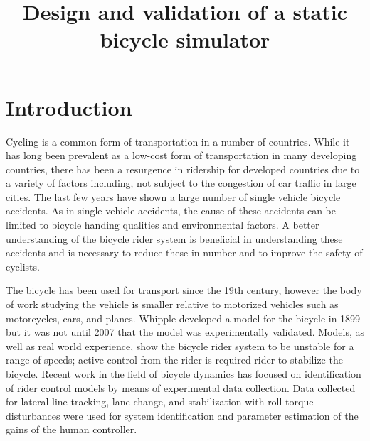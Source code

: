 \documentclass[11pt,a4paper,reqno]{amsart}
\title{Design and validation of a static bicycle simulator}
\begin{document}
\maketitle

\section{Introduction}
Cycling is a common form of transportation in a number of countries.
While it has long been prevalent as a low-cost form of transportation in many developing countries,
there has been a resurgence in ridership for developed countries\cite{FIXME} due to a variety of factors including,
not subject to the congestion of car traffic in large cities.
The last few years have shown a large number of single vehicle bicycle accidents\cite{FIXME}.
As in single-vehicle accidents, the cause of these accidents can be limited to bicycle handing qualities and
environmental factors.
A better understanding of the bicycle rider system is beneficial in understanding these accidents and is necessary to
reduce these in number and to improve the safety of cyclists.

The bicycle has been used for transport since the 19th century\cite{wilson2004}, however the body of work studying the
vehicle is smaller relative to motorized vehicles such as motorcycles, cars, and planes.
Whipple developed a model for the bicycle in 1899\cite{whipple1899} but it was not until 2007 that the model was
experimentally validated\cite{kooijman2008}.
Models, as well as real world experience, show the bicycle rider system to be unstable for a range of speeds;
active control from the rider is required rider to stabilize the bicycle.
Recent work in the field of bicycle dynamics has focused on identification of rider control
models by means of experimental data collection\cite{delange2011,hess2012,hladun2015}.
Data collected for lateral line tracking\cite{delange2011,hess2012}, lane change\cite{hladun2015}, and stabilization
with roll torque disturbances\cite{delange2011,hess2012} were used for system identification and parameter estimation of
the gains of the human controller.
\end{document}

